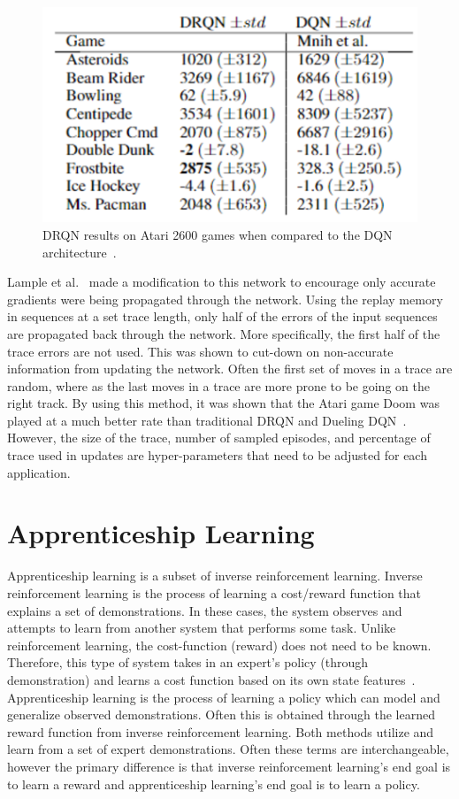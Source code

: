 \documentclass[12pt,american]{report}
\begin{document}
\begin{figure}
\centering
\includegraphics[scale=1]{images/drqn-results.png}
\caption{DRQN results on Atari 2600 games when compared to the DQN architecture~\cite{HausknechtDRQN}.}
\label{fig:drqn-results}
\end{figure}

Lample et al.~\cite{DBLP:journals/corr/LampleC16} made a modification to this network to encourage only accurate gradients were being propagated through the network. Using the replay memory in sequences at a set trace length, only half of the errors of the input sequences are propagated back through the network.  More specifically, the first half of the trace errors are not used.  This was shown to cut-down on non-accurate information from updating the network.  Often the first set of moves in a trace are random, where as the last moves in a trace are more prone to be going on the right track.  By using this method, it was shown that the Atari game Doom was played at a much better rate than traditional DRQN and Dueling DQN~\cite{DBLP:journals/corr/LampleC16}.  However, the size of the trace, number of sampled episodes, and percentage of trace used in updates are hyper-parameters that need to be adjusted for each application.


\section{Apprenticeship Learning}
	Apprenticeship learning is a subset of inverse reinforcement learning. Inverse reinforcement learning is the process of learning a cost/reward function that explains a set of demonstrations. In these cases, the system observes and attempts to learn from another system that performs some task. Unlike reinforcement learning, the cost-function (reward) does not need to be known. Therefore, this type of system takes in an expert's policy (through demonstration) and learns a cost function based on its own state features~\cite{jangir_2016}.	Apprenticeship learning is the process of learning a policy which can model and generalize observed demonstrations.  Often this is obtained through the learned reward function from inverse reinforcement learning.  Both methods utilize and learn from a set of expert demonstrations.  Often these terms are interchangeable, however the primary difference is that inverse reinforcement learning's end goal is to learn a reward and apprenticeship learning's end goal is to learn a policy. 
		
\end{document}
